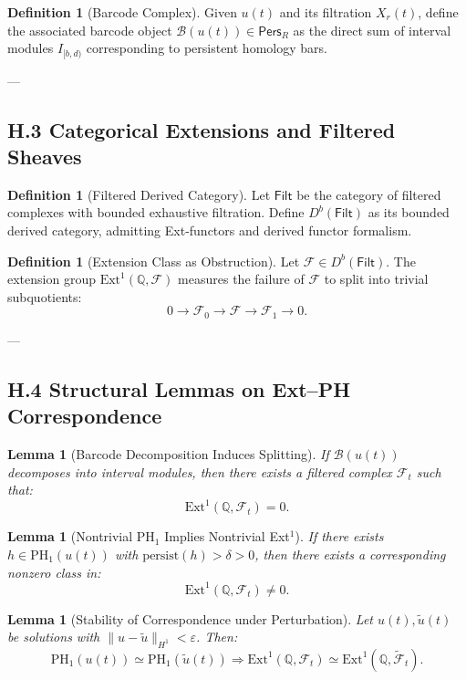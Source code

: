 \documentclass[11pt]{article}
\newtheorem{lemma}[theorem]{Lemma}
\theoremstyle{definition}
\newtheorem{definition}[theorem]{Definition}
\begin{document}
\begin{definition}[Barcode Complex]
Given $u(t)$ and its filtration $X_r(t)$, define the associated barcode object $\mathcal{B}(u(t)) \in \mathsf{Pers}_R$  
as the direct sum of interval modules $I_{[b,d)}$ corresponding to persistent homology bars.
\end{definition}

---

\subsection*{H.3 Categorical Extensions and Filtered Sheaves}

\begin{definition}[Filtered Derived Category]
Let $\mathsf{Filt}$ be the category of filtered complexes with bounded exhaustive filtration.  
Define $D^b(\mathsf{Filt})$ as its bounded derived category, admitting Ext-functors and derived functor formalism.
\end{definition}

\begin{definition}[Extension Class as Obstruction]
Let $\mathcal{F} \in D^b(\mathsf{Filt})$.  
The extension group $\mathrm{Ext}^1(\mathbb{Q}, \mathcal{F})$ measures the failure of $\mathcal{F}$ to split into trivial subquotients:
\[
0 \to \mathcal{F}_0 \to \mathcal{F} \to \mathcal{F}_1 \to 0.
\]
\end{definition}

---

\subsection*{H.4 Structural Lemmas on Ext–PH Correspondence}

\begin{lemma}[Barcode Decomposition Induces Splitting]
If $\mathcal{B}(u(t))$ decomposes into interval modules, then there exists a filtered complex $\mathcal{F}_t$ such that:
\[
\mathrm{Ext}^1(\mathbb{Q}, \mathcal{F}_t) = 0.
\]
\end{lemma}

\begin{lemma}[Nontrivial PH$_1$ Implies Nontrivial Ext$^1$]
If there exists $h \in \mathrm{PH}_1(u(t))$ with $\text{persist}(h) > \delta > 0$, then there exists a corresponding nonzero class in:
\[
\mathrm{Ext}^1(\mathbb{Q}, \mathcal{F}_t) \neq 0.
\]
\end{lemma}

\begin{lemma}[Stability of Correspondence under Perturbation]
Let $u(t), \tilde{u}(t)$ be solutions with $\|u - \tilde{u}\|_{H^1} < \varepsilon$. Then:
\[
\mathrm{PH}_1(u(t)) \simeq \mathrm{PH}_1(\tilde{u}(t)) \Rightarrow \mathrm{Ext}^1(\mathbb{Q}, \mathcal{F}_t) \simeq \mathrm{Ext}^1(\mathbb{Q}, \tilde{\mathcal{F}}_t).
\]
\end{lemma}
\end{document}

